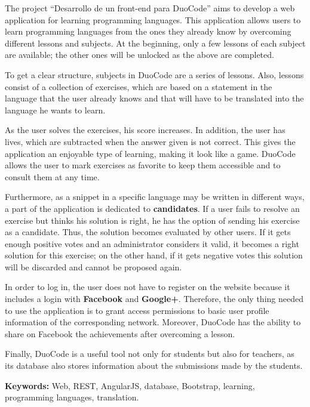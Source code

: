 The project ``Desarrollo de un front-end para DuoCode'' aims to develop a web application for learning programming languages. This application allows users to learn programming languages from the ones they already know by overcoming different lessons and subjects. At the beginning, only a few lessons of each subject are available; the other ones will be unlocked as the above are completed.

To get a clear structure, subjects in DuoCode are a series of lessons. Also, lessons consist of a collection of exercises, which are based on a statement in the language that the user already knows and that will have to be translated into the language he wants to learn.

As the user solves the exercises, his score increases. In addition, the user has lives, which are subtracted when the answer given is not correct. This gives the application an enjoyable type of learning, making it look like a game. DuoCode allows the user to mark exercises as favorite to keep them accessible and to consult them at any time. 

Furthermore, as a snippet in a specific language may be written in different ways, a part of the application is dedicated to \textbf{candidates}. If a user fails to resolve an exercise but thinks his solution is right, he has the option of sending his exercise as a candidate. Thus, the solution becomes evaluated by other users. If it gets enough positive votes and an administrator considers it valid, it becomes a right solution for this exercise; on the other hand, if it gets negative votes this solution will be discarded and cannot be proposed again.

In order to log in, the user does not have to register on the website because it includes a login with \textbf{Facebook} and \textbf{Google+}. Therefore, the only thing needed to use the application is to grant access permissions to basic user profile information of the corresponding network. Moreover, DuoCode has the ability to share on Facebook the achievements after overcoming a lesson.

Finally, DuoCode is a useful tool not only for students but also for teachers, as its database also stores information about the submissions made by the students.

\textbf{Keywords:} Web, REST, AngularJS, database, Bootstrap, learning, programming languages, translation.